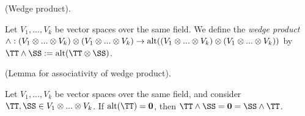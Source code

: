 \begin{defn}
    (Wedge product).
    
    Let $V_1, ..., V_k$ be vector spaces over the same field. We define the \textit{wedge product} \\ ${\wedge: (V_1 \otimes ... \otimes V_k) \otimes (V_1 \otimes ... \otimes V_k) \rightarrow \text{alt}((V_1 \otimes ... \otimes V_k) \otimes (V_1 \otimes ... \otimes V_k))}$ by $\TT \wedge \SS := \alt(\TT \otimes \SS)$.
\end{defn}

\begin{lemma}
    (Lemma for associativity of wedge product). 
    
    Let $V_1, ..., V_k$ be vector spaces over the same field, and consider $\TT, \SS \in V_1 \otimes ... \otimes V_k$. If $\alt(\TT) = \mathbf{0}$, then $\TT \wedge \SS = \mathbf{0} = \SS \wedge \TT$.
\end{lemma}

